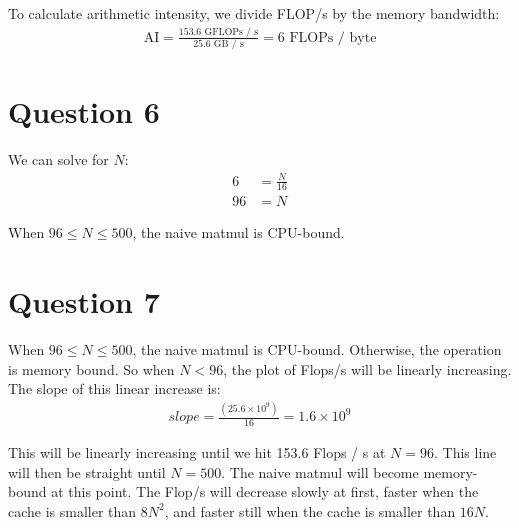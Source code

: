 \documentclass[11pt]{article}
\begin{document}
        To calculate arithmetic intensity, we divide FLOP/s by the memory bandwidth:
        \begin{align*}
            \text{AI} = \frac{153.6 \text{ GFLOPs / s}}{25.6 \text{ GB / s}} = 6 \text{ FLOPs / byte}
        \end{align*}

    \section*{Question 6}
        We can solve for $N$:
        \begin{align*}
            6 &= \frac{N}{16}\\[0.5em]
            96 &= N
        \end{align*}

        When $96 \leq N \leq 500$, the naive matmul is CPU-bound.

    \section*{Question 7}
        When $96 \leq N \leq 500$, the naive matmul is CPU-bound. Otherwise, the operation is memory bound. So when $N < 96$, the plot of Flops/s will be linearly increasing. The slope of this linear increase is:
        \begin{align*}
            slope = \frac{(25.6\times 10^9)}{16} = 1.6 \times 10^9
        \end{align*}

        This will be linearly increasing until we hit 153.6 Flops / s at $N = 96$. This line will then be straight until $N = 500$. The naive matmul will become memory-bound at this point. The Flop/s will decrease slowly at first, faster when the cache is smaller than $8N^2$, and faster still when the cache is smaller than $16N$.
\end{document}
